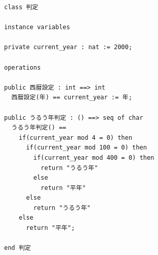 \documentclass[uplatex, report, a4j, 10pt]{jsbook}
\begin{document}
\lstset{language=}
\begin{figure}[tp]
  \begin{lstlisting}[caption=操作を含むVDM++仕様,label=fig:multiple_definition]
class 判定

instance variables

private current_year : nat := 2000;

operations

public 西暦設定 : int ==> int
  西暦設定(年) == current_year := 年;

public うるう年判定 : () ==> seq of char
  うるう年判定() ==
    if(current_year mod 4 = 0) then
      if(current_year mod 100 = 0) then
        if(current_year mod 400 = 0) then
          return "うるう年"
        else
          return "平年"
      else
        return "うるう年"
    else
      return "平年";

end 判定
\end{lstlisting}
\end{figure}

\end{document}
